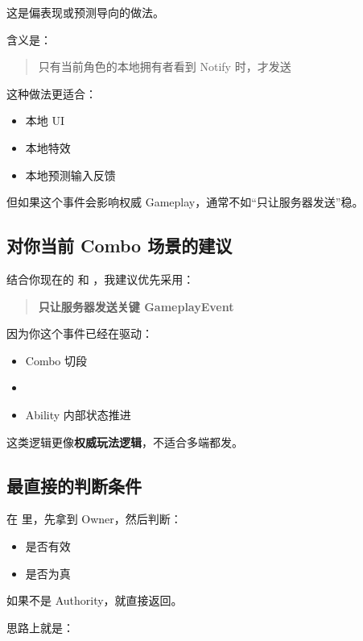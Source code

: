 这是偏表现或预测导向的做法。

含义是：

\begin{quote}
	只有当前角色的本地拥有者看到 Notify 时，才发送
\end{quote}

这种做法更适合：

\begin{itemize}
	\item 本地 UI
	\item 本地特效
	\item 本地预测输入反馈
\end{itemize}

但如果这个事件会影响权威 Gameplay，通常不如“只让服务器发送”稳。

\subsection{对你当前 Combo 场景的建议}

结合你现在的  和 ，我建议优先采用：

\begin{quote}
	\textbf{只让服务器发送关键 GameplayEvent}
\end{quote}

因为你这个事件已经在驱动：

\begin{itemize}
	\item Combo 切段
	\item {}
	\item Ability 内部状态推进
\end{itemize}

这类逻辑更像\textbf{权威玩法逻辑}，不适合多端都发。

\subsection{最直接的判断条件}

在  里，先拿到 Owner，然后判断：

\begin{itemize}
	\item {} 是否有效
	\item {} 是否为真
\end{itemize}

如果不是 Authority，就直接返回。

思路上就是：

